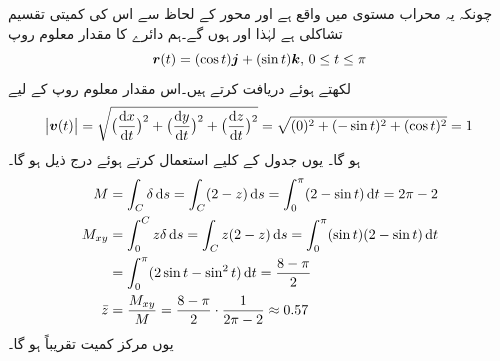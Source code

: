 چونکہ یہ  محراب مستوی  میں واقع ہے  اور محور  کے لحاظ سے اس کی کمیتی تقسیم تشاکلی ہے   لہٰذا  اور  ہوں گے۔ہم دائرے  کا  مقدار معلوم روپ
\[{{\boldsymbol{r}}}(t)=(\cos t){\boldsymbol{j}}+(\sin t){\boldsymbol{k}},\, 0\le t\le \pi\]
 لکھتے ہوئے  دریافت کرتے ہیں۔اس مقدار معلوم روپ کے لیے
\[\abs{\kvec{v}(t)}=\sqrt{\big(\frac{\dif x}{\dif t}\big)^2+\big(\frac{\dif y}{\dif t}\big)^2+\big(\frac{\dif z}{\dif t}\big)^2}=\sqrt{(0)^2+(-\sin t)^2+(\cos t)^2}=1\]
ہو گا۔ یوں جدول   کے کلیے  استعمال کرتے ہوئے درج ذیل ہو گا۔
\begin{align*}
M&=\int_C \delta \dif s=\int_C (2-z)\dif s=\int_0^{\pi}(2-\sin t)\dif t=2\pi-2\\
M_{xy}&=\int_0^C z\delta \dif s=\int_C z(2-z)\dif s=\int_0^{\pi} (\sin t)(2-\sin t)\dif t\\
&=\int_0^{\pi} (2\sin t-\sin^2 t)\dif t=\frac{8-\pi}{2}\\
\bar{z}&=\frac{M_{xy}}{M}=\frac{8-\pi}{2}\cdot\frac{1}{2\pi-2}\approx 0.57
\end{align*}
یوں مرکز کمیت تقریباً  ہو گا۔


